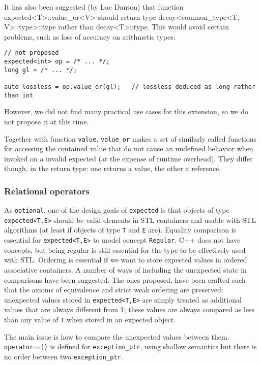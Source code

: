 \documentclass[a4paper,10pt]{article}
\newcommand{\cpp}[1]{\lstinline{#1}}
\begin{document}
It has also been suggested (by Luc Danton) that function expected<T>::value_or<V> should return type decay<common_type<T, V>::type>::type rather than decay<T>::type. This would avoid certain problems, such as loss of accuracy on arithmetic types:

\begin{lstlisting}
// not proposed
expected<int> op = /* ... */;
long gl = /* ... */;

auto lossless = op.value_or(gl);   // lossless deduced as long rather than int
\end{lstlisting}

However, we did not find many practical use cases for this extension, so we do not propose it at this time.

Together with function \cpp{value}, \cpp{value_or} makes a set of similarly called functions for accessing the contained value that do not cause an undefined behavior when invoked on a invalid expected (at the expense of runtime overhead). They differ though, in the return type: one returns a value, the other a reference.

\subsubsection{Relational operators}

As \cpp{optional}, one of the design goals of \cpp{expected} is that objects of type \cpp{expected<T,E>} should be valid elements in STL containers and usable with STL algorithms (at least if objects of type \cpp{T} and \cpp{E} are). Equality comparison is essential for \cpp{expected<T,E>} to model concept \cpp{Regular}. C++ does not have concepts, but being regular is still essential for the type to be effectively used with STL. Ordering is essential if we want to store expected values in ordered associative containers. A number of ways of including the unexpected state in comparisons have been suggested. The ones proposed, have been crafted such that the axioms of equivalence and strict weak ordering are preserved: unexpected values stored in \cpp{expected<T,E>} are simply treated as additional values that are always different from \cpp{T}; these values are always compared as less than any value of \cpp{T} when stored in an expected object. 

   
The main issue is how to compare the unexpected values between them.  \cpp{operator==()} is defined for \cpp{exception_ptr}, using shallow semantics but there is no order between two \cpp{exception_ptr}.
\end{document}
